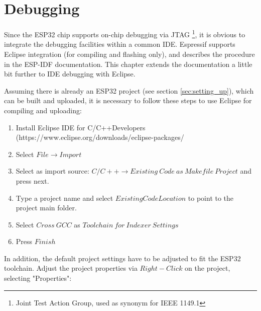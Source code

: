 \documentclass[]{scrreprt}%
\begin{document}
\section{Debugging}

Since the ESP32 chip supports on-chip debugging via JTAG \footnote{Joint Test Action Group, used as synonym for IEEE 1149.1}, it is obvious to integrate the debugging facilities
within a common IDE. Espressif supports Eclipse integration (for compiling and flashing only), and describes the procedure in the ESP-IDF documentation. 
This chapter extends the documentation a little bit further to IDE debugging with Eclipse.

Assuming there is already an ESP32 project (see section \ref{sec:setting_up}), which can be built and uploaded, it is necessary to follow these steps to use Eclipse for compiling and uploading:

\begin{enumerate}
 \item Install Eclipse IDE for C/C++Developers (https://www.eclipse.org/downloads/eclipse-packages/ 
 \item Select $File\rightarrow Import$
 \item Select as import source: $C/C++ \rightarrow Existing\ Code\ as\ Makefile\ Project$ and press next.
 \item Type a project name and select $Existing Code Location$ to point to the project main folder.
 \item Select $Cross\ GCC$ as $Toolchain\ for\ Indexer\ Settings$
 \item Press $Finish$
\end{enumerate}

In addition, the default project settings have to be adjusted to fit the ESP32 toolchain.
Adjust the project properties via $Right-Click$ on the project, selecting "Properties":
\end{document}
